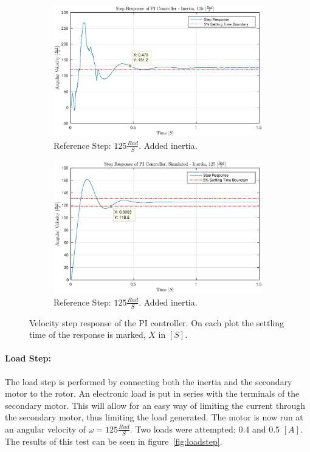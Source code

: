 \begin{figure}[!h]
	\begin{subfigure}[t]{.49\linewidth}
		\centering
		\includegraphics[width=\textwidth]{graphics/step_125_pi_inertia_real}
		\caption{Reference Step: $125 \frac{Rad}{S}$. Added inertia.}
		\label{fig:stepinertiareal}
	\end{subfigure}
	\begin{subfigure}[t]{.49\linewidth}
		\centering
		\includegraphics[width=\textwidth]{graphics/step_125_pi_inertia_simulated}
		\caption{Reference Step: $125 \frac{Rad}{S}$. Added inertia.}
		\label{fig:stepinertiasimulated}
	\end{subfigure}
	\caption[Velocity step response of PI controller with inertia.]{Velocity step response of the PI controller. On each plot the settling time of the response is marked, $X$ in $[S]$.}
	\label{fig:stepinertia}
\end{figure}

\paragraph{Load Step:}
The load step is performed by connecting both the inertia and the secondary motor to the rotor.
An electronic load is put in series with the terminals of the secondary motor.
This will allow for an easy way of limiting the current through the secondary motor, thus limiting the load generated.
The motor is now run at an angular velocity of $\omega=125\frac{Rad}{S}$.
Two loads were attempted: 0.4 and 0.5 $[A]$.
The results of this test can be seen in figure~\ref{fig:loadstep}.

